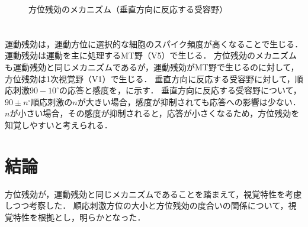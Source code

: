 \begin{figure}
    \centering
    \caption{方位残効のメカニズム（垂直方向に反応する受容野）}
    \label{fig:方位残効のメカニズム}
    \vspace{-.5cm}
\end{figure}
\section{\consideration}
運動残効は，運動方位に選択的な細胞のスパイク頻度が高くなることで生じる．運動残効は運動を主に処理するMT野（V5）で生じる．
方位残効のメカニズムも運動残効と同じメカニズムであるが，運動残効がMT野で生じるのに対して，方位残効は1次視覚野（V1）で生じる．
垂直方向に反応する受容野に対して，順応刺激\(90-10^\circ\)の応答と感度を，に示す．
垂直方向に反応する受容野について，\(90\pm n^\circ\)順応刺激の\(n\)が大きい場合，感度が抑制されても応答への影響は少ない．
\(n\)が小さい場合，その感度が抑制されると，応答が小さくなるため，方位残効を知覚しやすいと考えられる．
\section{結論}
方位残効が，運動残効と同じメカニズムであることを踏まえて，視覚特性を考慮しつつ考察した．
順応刺激方位の大小と方位残効の度合いの関係について，視覚特性を根拠とし，明らかとなった．
